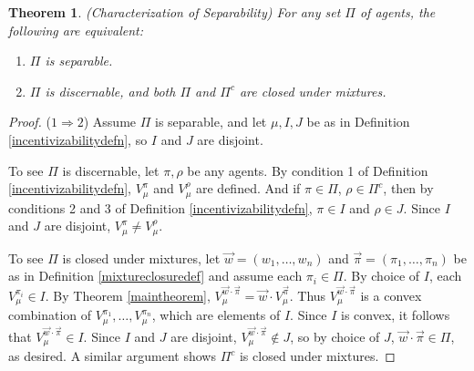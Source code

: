 \documentclass[twoside]{article}
\newtheorem{theorem}{Theorem}
\begin{document}

\begin{theorem}
\label{separabilitycharacterizationthm}
    (Characterization of Separability)
    For any set $\Pi$ of agents, the following are equivalent:
    \begin{enumerate}
        \item $\Pi$ is separable.
        \item $\Pi$ is discernable, and both $\Pi$ and $\Pi^c$ are closed under mixtures.
    \end{enumerate}
\end{theorem}

\begin{proof}
    ($1\Rightarrow 2$)
    Assume $\Pi$ is separable, and let $\mu,I,J$ be as in
    Definition \ref{incentivizabilitydefn}, so $I$ and $J$ are disjoint.

    To see $\Pi$ is discernable, let $\pi,\rho$ be any agents.
    By condition 1 of Definition \ref{incentivizabilitydefn},
    $V^\pi_\mu$ and $V^\rho_\mu$ are defined. And if $\pi\in\Pi$, $\rho\in\Pi^c$, then
    by conditions 2 and 3 of Definition \ref{incentivizabilitydefn},
    $\pi\in I$ and $\rho\in J$. Since $I$ and $J$ are disjoint,
    $V^\pi_\mu\not=V^\rho_\mu$.

    To see $\Pi$ is closed under mixtures, let $\vec w=(w_1,\ldots,w_n)$
    and $\vec\pi=(\pi_1,\ldots,\pi_n)$ be as in Definition \ref{mixtureclosuredef}
    and assume each $\pi_i\in\Pi$.
    By choice of $I$, each $V^{\pi_i}_\mu\in I$.
    By Theorem \ref{maintheorem},
    $V^{\vec w\cdot\vec\pi}_\mu=\vec w\cdot V^{\vec\pi}_\mu$.
    Thus $V^{\vec w\cdot\vec\pi}_\mu$ is a convex combination
    of $V^{\pi_1}_\mu,\ldots,V^{\pi_n}_\mu$, which are elements of $I$.
    Since $I$ is convex, it follows that $V^{\vec w\cdot\vec\pi}_\mu\in I$.
    Since $I$ and $J$ are disjoint, $V^{\vec w\cdot\vec\pi}_\mu\not\in J$,
    so by choice of $J$, $\vec w\cdot\vec\pi\in\Pi$, as desired.
    A similar argument shows $\Pi^c$ is closed under mixtures.


\end{proof}
\end{document}
